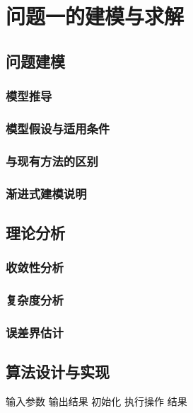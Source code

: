 \documentclass[12pt,a4paper]{article}
\begin{document}
\section{问题一的建模与求解}
\subsection{问题建模}
\subsubsection{模型推导}  %
\subsubsection{模型假设与适用条件}
\subsubsection{与现有方法的区别}
\subsubsection{渐进式建模说明}  %

\subsection{理论分析}  %
\subsubsection{收敛性分析}
\subsubsection{复杂度分析}
\subsubsection{误差界估计}

\subsection{算法设计与实现}
\begin{algorithm}[H]
\caption{算法名称}
\begin{algorithmic}[1]
\Require 输入参数
\Ensure 输出结果
\State 初始化
    \State 执行操作
\EndFor
\State \Return 结果
\end{algorithmic}
\end{algorithm}
\end{document}
